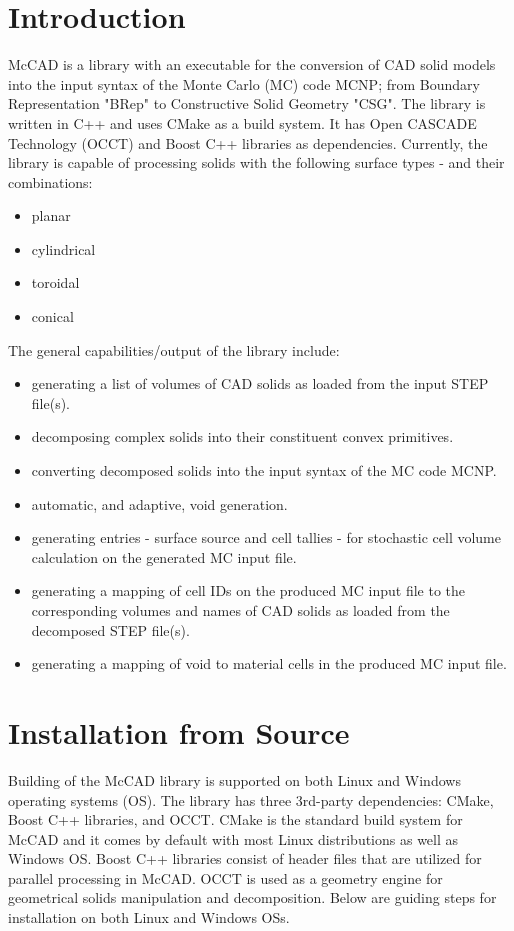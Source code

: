 \documentclass[12pt, a4paper, titlepage]{article}
\begin{document}
\section{Introduction} \label{sec:Introduction}
McCAD is a library with an executable for the conversion of CAD solid models into the input syntax of the Monte Carlo (MC) code MCNP; from Boundary Representation "BRep" to Constructive Solid Geometry "CSG". The library is written in C++ and uses CMake as a build system. It has Open CASCADE Technology (OCCT) and Boost C++ libraries as dependencies. Currently, the library is capable of processing solids with the following surface types - and their combinations:
\begin{itemize}
	\item planar
	\item cylindrical
	\item toroidal
         \item conical
\end{itemize}
The general capabilities/output of the library include:
\begin{itemize}
	\item generating a list of volumes of CAD solids as loaded from the input STEP file(s).
	\item decomposing complex solids into their constituent convex primitives.
	\item converting decomposed solids into the input syntax of the MC code MCNP.
	\item automatic, and adaptive, void generation.
	\item generating entries - surface source and cell tallies - for stochastic cell volume calculation on the generated MC input file.
	\item generating a mapping of cell IDs on the produced MC input file to the corresponding volumes and names of CAD solids as loaded from the decomposed STEP file(s).
	\item generating a mapping of void to material cells in the produced MC input file.
\end{itemize}

\section{Installation from Source} \label{sec:Installation from Source}
Building of the McCAD library is supported on both Linux and Windows operating systems (OS). The library has three 3rd-party dependencies: CMake, Boost C++ libraries, and OCCT. CMake is the standard build system for McCAD and it comes by default with most Linux distributions as well as Windows OS. Boost C++ libraries consist of header files that are utilized for parallel processing in McCAD. OCCT is used as a geometry engine for geometrical solids manipulation and decomposition. Below are guiding steps for installation on both Linux and Windows OSs. 
\end{document}
